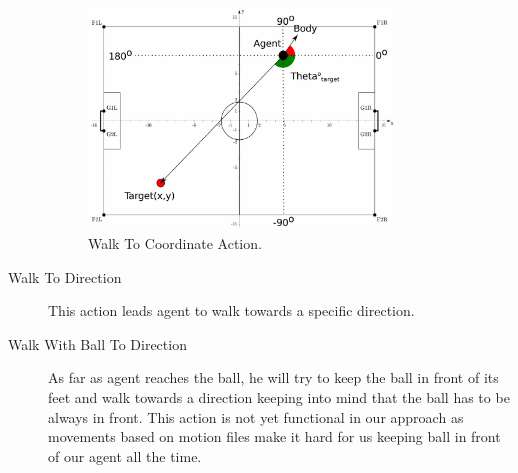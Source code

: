 \begin{description}
 \begin{figure}[t!]
\centering
  \includegraphics[width=0.8\textwidth]{Chapter3/figures/GoToPos.pdf}
  \caption{Walk To Coordinate Action.}
  \label{fig:WalkToCoordinate}
\end{figure}


 \item[Walk To Direction]
 This action leads agent to walk towards a specific direction.
 
 \item[Walk With Ball To Direction]
 As far as agent reaches the ball, he will try to keep the ball in front of its feet and walk towards a direction keeping into mind that the ball has to be always in front. This action is not yet functional in our approach as movements based on motion files make it hard for us keeping ball in front of our agent all the time.
 
\end{description}



